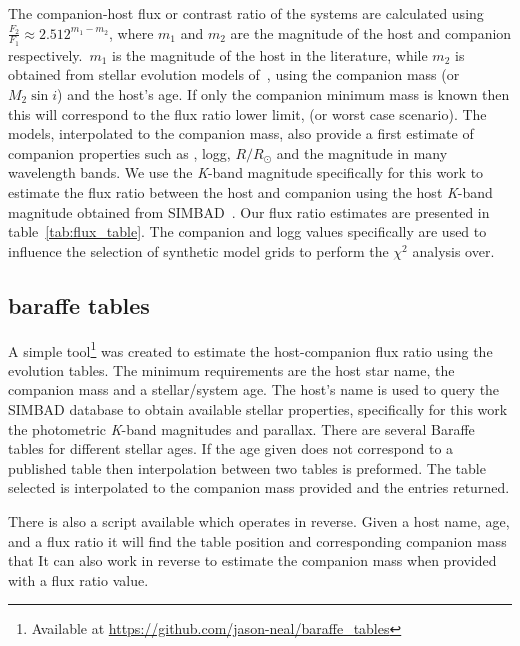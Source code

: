 \label{compaion flux ration}
The companion-host flux or contrast ratio of the systems are calculated using \(\frac{F_{2}}{F_{1}} \approx 2.512^{m_{1}-m_{2}}\), where \(m_{1}\) and \(m_{2}\) are the magnitude of the host and companion respectively.\ \(m_{1}\) is the magnitude of the host in the literature, while \(m_{2}\) is obtained from stellar evolution models of~\citet{baraffe_evolutionary_2003, baraffe_new_2015}, using the companion mass (or \(M_{2}\sin{i}\)) and the host's age. If only the companion minimum mass is known then this will correspond to the flux ratio lower limit, (or worst case scenario). The models, interpolated to the companion mass, also provide a first estimate of companion properties such as \teff{}, logg, \(R/R_{\odot}\) and the magnitude in many wavelength bands.
We use the \emph{K}-band magnitude specifically for this work to estimate the flux ratio between the host and companion using the host \emph{K}-band magnitude obtained from SIMBAD~\citep{wenger_simbad_2000}. Our flux ratio estimates are presented in table~\ref{tab:flux_table}.
The companion \teff{} and logg values specifically are used to influence the selection of synthetic model grids to perform the \(\chi^2\) analysis over.

\subsection{baraffe tables}
A simple tool\footnote{Available at \url{https://github.com/jason-neal/baraffe_tables}} was created to estimate the host-companion flux ratio using the~\citep{baraffe_evolutionary_2003,baraffe_new_2015} evolution tables. The minimum requirements are the host star name, the companion mass and a stellar/system age. The host's name is used to query the {SIMBAD} database to obtain available stellar properties, specifically for this work the photometric \textit{K}-band magnitudes and parallax. There are several Baraffe tables for different stellar ages. If the age given does not correspond to a published table then interpolation between two tables is preformed. The table selected is interpolated to the companion mass provided and the entries returned.

There is also a script available which operates in reverse. Given a host name, age, and a flux ratio it will find the table position and corresponding companion mass that It can also work in reverse to estimate the companion mass when provided with a flux ratio value.




